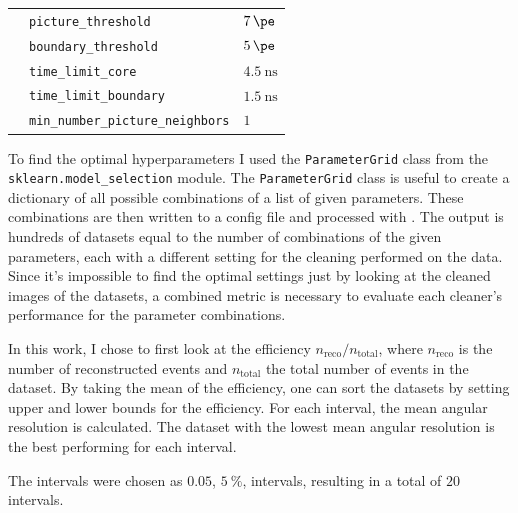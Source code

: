 \begin{table}
\begin{tabular}{l l l}
        \addlinespace[0.5em]
        \tcc{}      & \texttt{picture\_threshold}               & \qquad\(\SI{7}{\pe}\) \\
                    & \texttt{boundary\_threshold}              & \qquad\(\SI{5}{\pe}\) \\
                    & \texttt{time\_limit\_core}                & \qquad\(\SI{4.5}{\nano\second}\) \\
                    & \texttt{time\_limit\_boundary}            & \qquad\(\SI{1.5}{\nano\second}\) \\
                    & \texttt{min\_number\_picture\_neighbors}  & \qquad\(\num{1}\) \\
        \bottomrule
  \end{tabular}
\end{table}

To find the optimal hyperparameters I used the \texttt{ParameterGrid} class from the
\texttt{sklearn.model\_selection} module. The \texttt{ParameterGrid} class is useful to create a
dictionary of all possible combinations of a list of given parameters. These combinations are then
written to a config file and processed with \ctapipe{}. The output is hundreds of datasets equal to
the number of combinations of the given parameters, each with a different setting for the cleaning
performed on the data. Since it's impossible to find the optimal settings just by looking at the
cleaned images of the datasets, a combined metric is necessary to evaluate each cleaner's performance
for the parameter combinations.

In this work, I chose to first look at the efficiency \(n_{\mathrm{reco}} / n_{\mathrm{total}}\), where
\(n_{\mathrm{reco}}\) is the number of reconstructed events and \(n_{\mathrm{total}}\)
the total number of events in the dataset. By taking the mean of the efficiency, one can sort the
datasets by setting upper and lower bounds for the efficiency. For each interval, the mean angular
resolution is calculated. The dataset with the lowest mean angular resolution is the best performing
for each interval.

The intervals were chosen as \(\num{0.05}\), \ie \(\SI{5}{\percent}\), intervals, resulting in a total
of \(\num{20}\) intervals.
